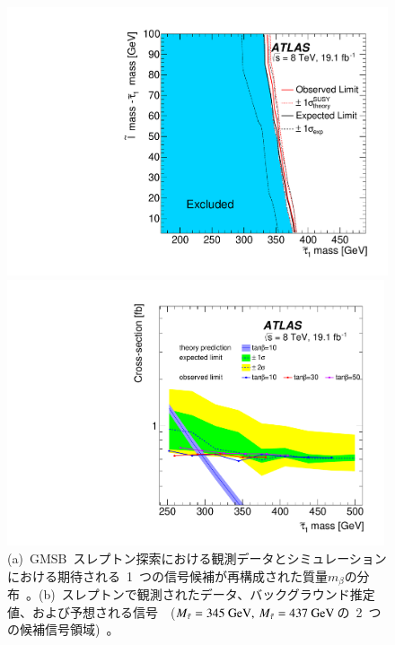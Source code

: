 \begin{figure}[tbp]
\begin{minipage}{0.49\hsize}
    \subcaption{}
    \end{minipage}\\
    \begin{minipage}{0.49\hsize}
    \centering   
    \includegraphics[width=\textwidth]{img/stau/fig_06a.pdf}
    \subcaption{}
    \end{minipage}
    \begin{minipage}{0.49\hsize}
    \centering   
    \includegraphics[width=0.99\textwidth]{img/stau/fig_07a.pdf}
    \end{minipage}
    \caption[(a)~GMSB~スレプトン探索における観測データとシミュレーションにおける期待される~1~つの信号候補が再構成された質量$m_{\beta}$の分布。(b)~スレプトンで観測されたデータ、バックグラウンド推定値、および予想される信号。(c)~$95\%$信頼水準における直接生成されたスレプトンの除外領域。(d)~スタウ粒子を直接生成するための質量と$\rm{tan}\beta$の~3~つの値の関数としての断面積の上限。]{(a)~GMSB~スレプトン探索における観測データとシミュレーションにおける期待される~1~つの信号候補が再構成された質量$m_{\beta}$の分布~\cite{AR:03}。(b)~スレプトンで観測されたデータ、バックグラウンド推定値、および予想される信号~\cite{AR:03}~($\it{M}_{\tilde{\tau}}=\rm{345}~\rm{GeV},~\it{M}_{\tilde{\tau}}=\rm{437}~\rm{GeV}$の~2~つの候補信号領域)~。
}
\end{figure}

